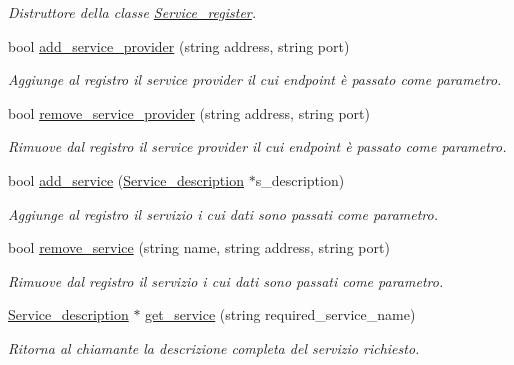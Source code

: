 \begin{DoxyCompactItemize}
\begin{DoxyCompactList}\small\item\em Distruttore della classe \hyperlink{class_service__register}{Service\-\_\-register}. \end{DoxyCompactList}\item 
bool \hyperlink{class_service__register_abf7d561090bae06f91fe8b0a9fc1f5bf}{add\-\_\-service\-\_\-provider} (string address, string port)
\begin{DoxyCompactList}\small\item\em Aggiunge al registro il service provider il cui endpoint è passato come parametro. \end{DoxyCompactList}\item 
bool \hyperlink{class_service__register_aa60c54247b649909f5f5775d62d9ae35}{remove\-\_\-service\-\_\-provider} (string address, string port)
\begin{DoxyCompactList}\small\item\em Rimuove dal registro il service provider il cui endpoint è passato come parametro. \end{DoxyCompactList}\item 
bool \hyperlink{class_service__register_a94110c8083c4cba9d20186d9f5c7ec5c}{add\-\_\-service} (\hyperlink{struct_service__description}{Service\-\_\-description} $\ast$s\-\_\-description)
\begin{DoxyCompactList}\small\item\em Aggiunge al registro il servizio i cui dati sono passati come parametro. \end{DoxyCompactList}\item 
bool \hyperlink{class_service__register_a600ffedf9bfcdf64f72aab435f3dd54f}{remove\-\_\-service} (string name, string address, string port)
\begin{DoxyCompactList}\small\item\em Rimuove dal registro il servizio i cui dati sono passati come parametro. \end{DoxyCompactList}\item 
\hyperlink{struct_service__description}{Service\-\_\-description} $\ast$ \hyperlink{class_service__register_a72fa4990209781c20e8d1d92e7b989ab}{get\-\_\-service} (string required\-\_\-service\-\_\-name)
\begin{DoxyCompactList}\small\item\em Ritorna al chiamante la descrizione completa del servizio richiesto. \end{DoxyCompactList}\item 

\end{DoxyCompactItemize}
